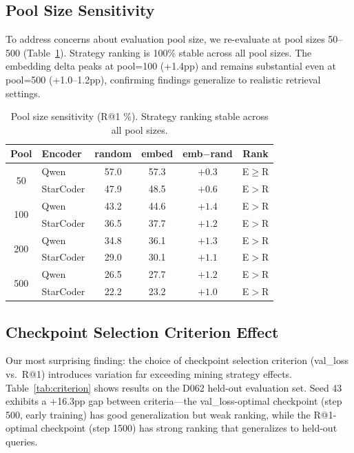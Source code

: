 \documentclass[11pt,a4paper]{article}
\begin{document}
\subsection{Pool Size Sensitivity}
\label{sec:poolsize}

To address concerns about evaluation pool size, we re-evaluate at pool sizes 50--500 (Table~\ref{tab:poolsize}). Strategy ranking is 100\% stable across all pool sizes. The embedding delta peaks at pool=100 (+1.4pp) and remains substantial even at pool=500 (+1.0--1.2pp), confirming findings generalize to realistic retrieval settings.

\begin{table}[t]
\centering
\small
\caption{Pool size sensitivity (R@1 \%). Strategy ranking stable across all pool sizes.}
\label{tab:poolsize}
\begin{tabular}{clcccc}
\toprule
Pool & Encoder & random & embed & emb$-$rand & Rank \\
\midrule
\multirow{2}{*}{50} & Qwen & 57.0 & 57.3 & $+0.3$ & E$\geq$R \\
& StarCoder & 47.9 & 48.5 & $+0.6$ & E$>$R \\
\midrule
\multirow{2}{*}{100} & Qwen & 43.2 & 44.6 & $+1.4$ & E$>$R \\
& StarCoder & 36.5 & 37.7 & $+1.2$ & E$>$R \\
\midrule
\multirow{2}{*}{200} & Qwen & 34.8 & 36.1 & $+1.3$ & E$>$R \\
& StarCoder & 29.0 & 30.1 & $+1.1$ & E$>$R \\
\midrule
\multirow{2}{*}{500} & Qwen & 26.5 & 27.7 & $+1.2$ & E$>$R \\
& StarCoder & 22.2 & 23.2 & $+1.0$ & E$>$R \\
\bottomrule
\end{tabular}
\end{table}

\subsection{Checkpoint Selection Criterion Effect}
\label{sec:criterion}

Our most surprising finding: the choice of checkpoint selection criterion (val\_loss vs.\ R@1) introduces variation far exceeding mining strategy effects. Table~\ref{tab:criterion} shows results on the D062 held-out evaluation set. Seed 43 exhibits a +16.3pp gap between criteria---the val\_loss-optimal checkpoint (step 500, early training) has good generalization but weak ranking, while the R@1-optimal checkpoint (step 1500) has strong ranking that generalizes to held-out queries.
\end{document}
